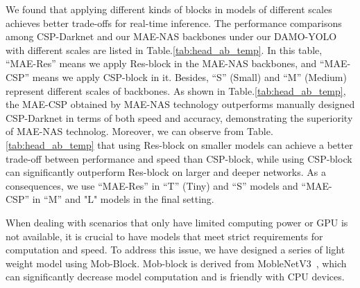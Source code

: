 \documentclass[10pt,twocolumn,letterpaper]{article}
\begin{document}
We found that applying different kinds of blocks in models of different scales achieves better trade-offs for real-time inference.
The performance comparisons among CSP-Darknet and our MAE-NAS backbones under our DAMO-YOLO with different scales are listed in Table.\ref{tab:head_ab_temp}.
In this table, ``MAE-Res'' means we apply Res-block in the MAE-NAS backbones, and ``MAE-CSP'' means we apply CSP-block in it. Besides, ``S'' (Small) and ``M'' (Medium) represent different scales of backbones. As shown in Table.\ref{tab:head_ab_temp}, the MAE-CSP obtained by MAE-NAS technology outperforms manually designed CSP-Darknet in terms of both speed and accuracy, demonstrating the superiority of MAE-NAS technolog. Moreover, we can observe from Table.\ref{tab:head_ab_temp} that using Res-block on smaller models can achieve a better trade-off between performance and speed than CSP-block, while using CSP-block can significantly outperform Res-block on larger and deeper networks. As a consequences, 
we use ``MAE-Res'' in ``T'' (Tiny) and ``S'' models and ``MAE-CSP'' in ``M'' and "L" models in the final setting. 

When dealing with scenarios that only have limited computing power or GPU is not available, it is crucial to have models that meet strict requirements for computation and speed. To address this issue, we have designed a series of light weight model using Mob-Block. Mob-block is derived from MobleNetV3~\cite{howard2019searching}, which can significantly decrease model computation and is friendly with CPU devices.
\end{document}
